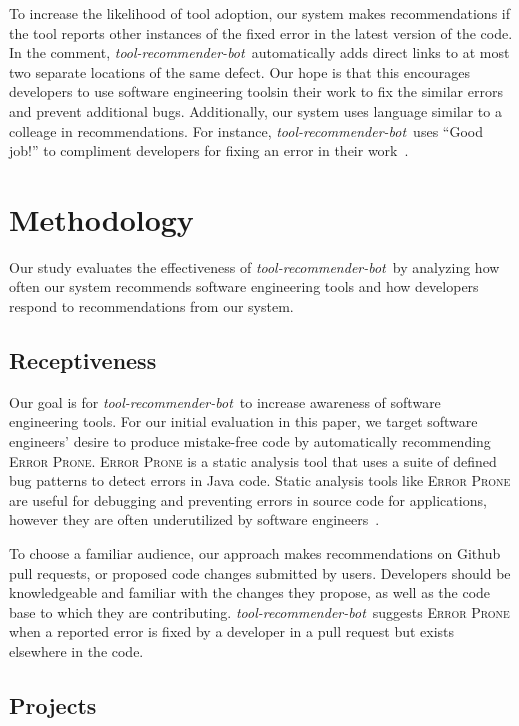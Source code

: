 \documentclass[conference]{IEEEtran}
\newcommand{\tool}{\textsl{tool-recommender-bot}}
\begin{document}
To increase the likelihood of tool adoption, our system makes recommendations if the tool reports other instances of the fixed error in the latest version of the code. In the comment, \tool~automatically adds direct links to at most two separate locations of the same defect. Our hope is that this encourages developers to use software engineering toolsin their work to fix the similar errors and prevent additional bugs. Additionally, our system uses language similar to a colleage in recommendations. For instance, \tool~uses ``Good job!'' to compliment developers for fixing an error in their work~\cite{?}.

\section{Methodology}

Our study evaluates the effectiveness of \tool~by analyzing how often our system recommends software engineering tools and how developers respond to recommendations from our system.

\subsection{Receptiveness}

Our goal is for \tool~to increase awareness of software engineering tools. For our initial evaluation in this paper, we target software engineers' desire to produce mistake-free code by automatically recommending \textsc{Error Prone}. \textsc{Error Prone} is a static analysis tool that uses a suite of defined bug patterns to detect errors in Java code. Static analysis tools like \textsc{Error Prone} are useful for debugging and preventing errors in source code for applications, however they are often underutilized by software engineers~\cite{Johnson2013Why}. 

To choose a familiar audience, our approach makes recommendations on Github pull requests, or proposed code changes submitted by users. Developers should be knowledgeable and familiar with the changes they propose, as well as the code base to which they are contributing. \tool~suggests \textsc{Error Prone} when a reported error is fixed by a developer in a pull request but exists elsewhere in the code. 

\subsection{Projects}
\end{document}
